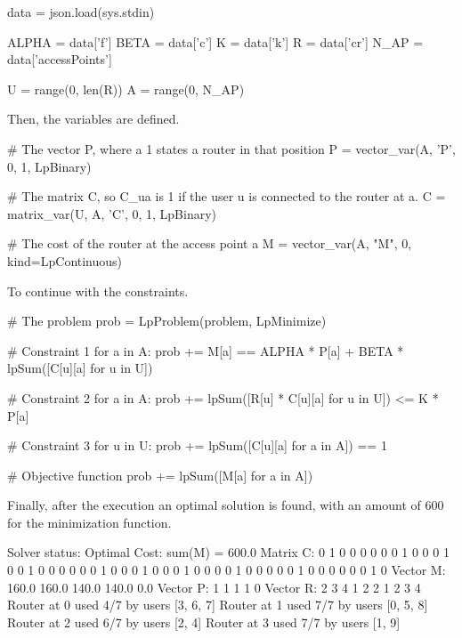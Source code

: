 \documentclass[11pt,a4paper]{article}
\begin{document}
\begin{pycode}
data = json.load(sys.stdin)

ALPHA = data['f']
BETA = data['c']
K = data['k']
R = data['cr']
N_AP = data['accessPoints']

U = range(0, len(R))
A = range(0, N_AP)
\end{pycode}
%
Then, the variables are defined.
%
\begin{pycode}
# The vector P, where a 1 states a router in that position
P = vector_var(A, 'P', 0, 1, LpBinary)

# The matrix C, so C_ua is 1 if the user u is connected to the router at a.
C = matrix_var(U, A, 'C', 0, 1, LpBinary)

# The cost of the router at the access point a
M = vector_var(A, "M", 0, kind=LpContinuous)
\end{pycode}
%
To continue with the constraints.
%
\begin{pycode}
# The problem
prob = LpProblem(problem, LpMinimize)

# Constraint 1
for a in A:
	prob += M[a] == ALPHA * P[a] + BETA * lpSum([C[u][a] for u in U])

# Constraint 2
for a in A:
	prob += lpSum([R[u] * C[u][a] for u in U]) <= K * P[a]

# Constraint 3
for u in U:
	prob += lpSum([C[u][a] for a in A]) == 1

# Objective function
prob += lpSum([M[a] for a in A])
\end{pycode}
%
Finally, after the execution an optimal solution is found, with an amount of 600 
for the minimization function.
%
\begin{textcode}
Solver status: Optimal
Cost: sum(M) = 600.0
Matrix C:
  0  1  0  0  0
  0  0  0  1  0
  0  0  1  0  0
  1  0  0  0  0
  0  0  1  0  0
  0  1  0  0  0
  1  0  0  0  0
  1  0  0  0  0
  0  1  0  0  0
  0  0  0  1  0
Vector M:
  160.0  160.0  140.0  140.0  0.0
Vector P:
  1  1  1  1  0
Vector R:
  2  3  4  1  2  2  1  2  3  4
Router at 0 used 4/7 by users [3, 6, 7]
Router at 1 used 7/7 by users [0, 5, 8]
Router at 2 used 6/7 by users [2, 4]
Router at 3 used 7/7 by users [1, 9]
\end{textcode}
\end{document}
